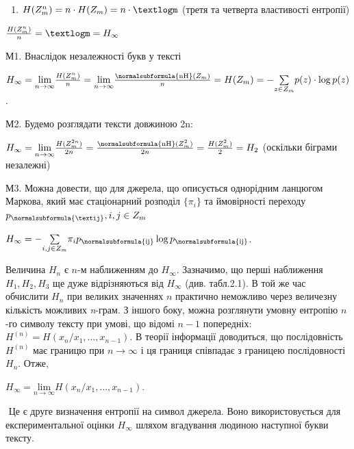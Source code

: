 \liststyleWWviiiNumxvi
\begin{enumerate}
\item  $H(Z_{m}^{n})=n\cdot H(Z_m)=n\cdot \textlogm$ (третя та
четверта властивості ентропії)
\end{enumerate}
{\centering  $\frac{H(Z_{m}^{n})}n=\textlogm=H_{\infty }$\par}

М1. Внаслідок незалежності букв у тексті

{\centering
 ${H_{\infty }=\underset{n\rightarrow \infty
}{\text{lim}}\frac{H(Z_{m}^{n})}{n}=\underset{n\rightarrow \infty
}{\text{lim}}\frac{\normalsubformula{\text{nH}}(Z_{m})}{n}=H(Z_{m})=-\underset{z\in
Z_{m}}{\sum }{p(z)\cdot \log p(z)}}$.
\par}

М2. Будемо розглядати тексти довжиною 2n:

 ${H_{\infty }=\underset{n\rightarrow \infty
}{\text{lim}}\frac{H(Z_{m}^{2n})}{2n}=\frac{\normalsubformula{\text{nH}}(Z_{m}^{2})}{2n}=\frac{H(Z_{m}^{2})}{2}=H_{2}}$
(оскільки біграми незалежні)

М3. Можна довести, що для джерела, що описується однорідним ланцюгом Маркова,
який має стаціонарний розподіл  $\{\pi _i\}$ та ймовірності переходу 
$p_{\normalsubformula{\textij}},i,j\in Z_m$

{\centering
 ${H_{\infty }=-\underset{i,j\in Z_{m}}{\sum }{\pi
_{i}p_{\normalsubformula{\text{ij}}}\log p_{\normalsubformula{\text{ij}}}}}$.
\par}

Величина  $H_n$ є  $n$-м наближенням до  $H_{\infty }$. Зазначимо,
що перші наближення  $H_{1},H_2,H_3$ ще дуже відрізняються від 
$H_{\infty }$ (див. табл.2.1). В той же час обчислити  $H_n$ при
великих значеннях  $n$ практично неможливо  через величезну кількість
можливих \textit{n}{}-грам. З іншого боку, можна розглянути умовну ентропію 
$n$-го символу тексту при умові, що відомі  $n-1$ попередніх: 
$H^{(n)}=H(x_n/x_1,\dots,x_{n-1})$. В теорії
інформації доводиться, що послідовність  $H^{(n)}$ має границю при 
$n\rightarrow \infty $ і ця границя співпадає з границею послідовності 
$H_n$. Отже,

{\centering
 ${H_{\infty }=\underset{n\rightarrow \infty
}{\text{lim}}H(x_{n}/x_{1},\dots,x_{n-1})}$.
\par}

 $ $ Це є друге визначення ентропії на символ джерела. Воно використовується для
експериментальної оцінки  $H_{\infty }$ шляхом вгадування людиною наступної
букви тексту. 


